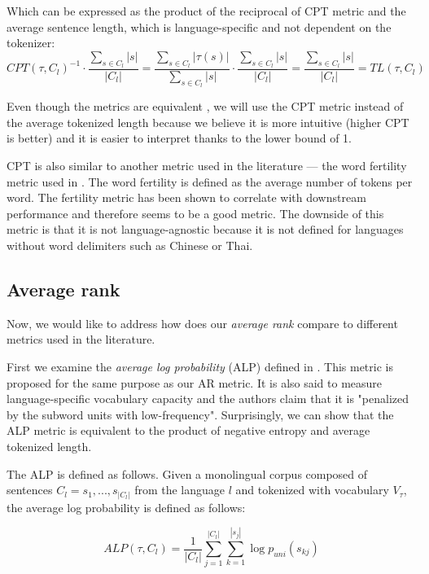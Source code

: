Which can be expressed as the product of the reciprocal of CPT metric and the average sentence length, which is language-specific and not dependent on the tokenizer:
\begin{equation}
    CPT(\tau, C_l)^{-1} \cdot \frac{\sum_{s \in C_l}|s|}{|C_l|} = \frac{\sum_{s \in C_l}|\tau(s)|}{\sum_{s \in C_l}|s|} \cdot \frac{\sum_{s \in C_l}|s|}{|C_l|} = \frac{\sum_{s \in C_l}|s|}{|C_l|} = TL(\tau, C_l)
\end{equation}

Even though the metrics are equivalent , we will use the CPT metric instead of the average tokenized length because we believe it is more intuitive (higher CPT is better) and it is easier to interpret thanks to the lower bound of 1.

CPT is also similar to another metric used in the literature --- the word fertility metric used in \citet{rust_how_2021}. The word fertility is defined as the average number of tokens per word. The fertility metric has been shown to correlate with downstream performance and therefore seems to be a good metric. The downside of this metric is that it is not language-agnostic because it is not defined for languages without word delimiters such as Chinese or Thai. 

\subsection{Average rank}

Now, we would like to address how does our \textit{average rank} compare to different metrics used in the literature. 

First we examine the \textit{average log probability} (ALP) defined in \citet{zheng_allocating_2021}. This metric is proposed for the same purpose as our AR metric. It is also said to measure language-specific vocabulary capacity and the authors claim that it is "penalized by the subword units with low-frequency". Surprisingly, we can show that the ALP metric is equivalent to the product of negative entropy and average tokenized length.

The ALP is defined as follows. Given a monolingual corpus composed of sentences $C_l = {s_1, ..., s_{|C_l|}}$ from the language $l$ and tokenized with vocabulary $V_\tau$, the average log probability is defined as follows:

\begin{equation}
    ALP(\tau, C_l) = \frac{1}{|C_l|} \sum_{j=1}^{|C_l|} \sum_{k=1}^{|s_j|} \log p_{uni}(s_{kj})
\end{equation}

